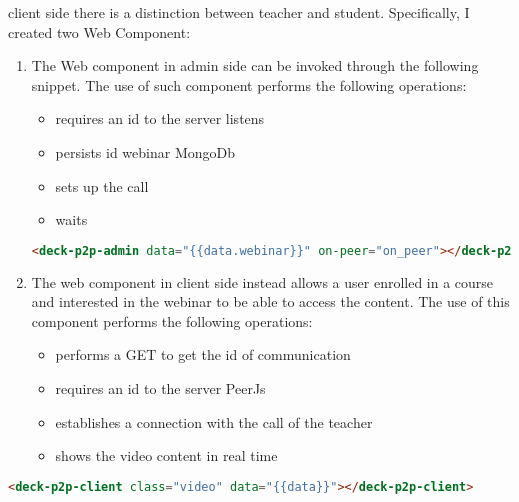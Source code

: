 client side there is a distinction between teacher and student. Specifically, I created two Web Component:
\begin{enumerate}

\item The Web component in admin side can be invoked through the following snippet.
The use of such component performs the following operations:
\begin{itemize}
\item requires an id to the server listens
\item persists id webinar MongoDb
\item sets up the call
\item waits
\end{itemize}

\begin{lstlisting}[language=html]
 <deck-p2p-admin data="{{data.webinar}}" on-peer="on_peer"></deck-p2p-admin>
\end{lstlisting}

\item The web component in client side instead allows a user enrolled in a course and interested in the webinar to be able to access the content.
The use of this component performs the following operations:
\begin{itemize}
\item performs a GET to get the id of communication
\item requires an id to the server PeerJs
\item establishes a connection with the call of the teacher
\item shows the video content in real time
\end{itemize}

\end{enumerate}
\begin{lstlisting}[language=html]
  <deck-p2p-client class="video" data="{{data}}"></deck-p2p-client>
\end{lstlisting}


